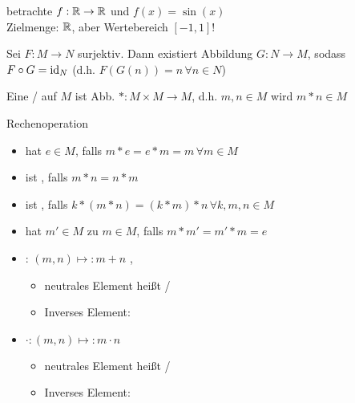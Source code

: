 \begin{example}
	betrachte $f:\mathbb{R}\to\mathbb{R}$ und $f(x)=\sin(x)$ \\
	Zielmenge: $\mathbb{R}$, aber Wertebereich $[-1,1]$!
\end{example}

\begin{proposition}
	Sei $F:M\rightarrow N$ surjektiv. Dann existiert Abbildung $G:N\rightarrow M$, sodass $F\circ G = \operatorname{id}_N$ (d.h. $F(G(n)) = n\,\forall n\in N$)
\end{proposition}

\begin{definition}[Verknüpfung]
	Eine  /  auf $M$ ist Abb. $*:M\times M\rightarrow M$, d.h. $m,n\in M$ wird  $m*n\in M$
	
	Rechenoperation
	\begin{itemize}
		\item hat  $e\in M$, falls $m*e = e*m = m\,\forall m\in M$
		\item ist , falls $m*n = n*m$
		\item ist , falls $k*(m*n) = (k*m)*n\,\forall k,m,n\in M$
		\item hat  $m'\in M$ zu $m\in M$, falls $m*m' = m'*m = e$
	\end{itemize}
\end{definition}

\begin{example}
	\begin{itemize}
		\item {}: $(m,n)\mapsto: m+n$ ,
		\begin{itemize}
			\item neutrales Element heißt  / 
			\item Inverses Element: 
		\end{itemize}
		\item {} $\cdot:(m,n)\mapsto: m\cdot n$ 
		\begin{itemize}
			\item neutrales Element heißt  / 
			\item Inverses Element:
		\end{itemize}
	\end{itemize}
\end{example}

